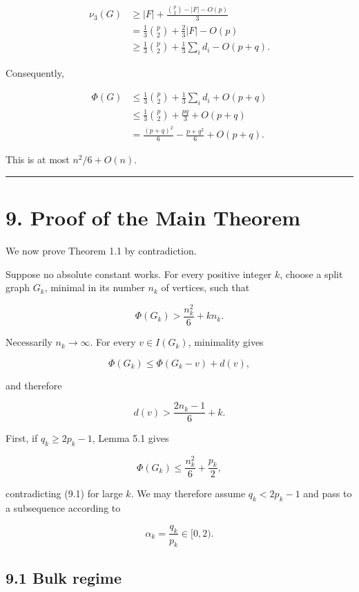 \documentclass[
  11pt,
]{article}
\begin{document}
\[
\begin{aligned}
\nu_3(G)
&\ge
|F|+\frac{\binom p2-|F|-O(p)}3\\
&=
\frac13\binom p2+\frac23|F|-O(p)\\
&\ge
\frac13\binom p2+\frac13\sum_i d_i-O(p+q).
\end{aligned}
\tag{8.10}
\]

Consequently,

\[
\begin{aligned}
\Phi(G)
&\le
\frac13\binom p2+\frac13\sum_i d_i+O(p+q)\\
&\le
\frac13\binom p2+\frac{pq}{3}+O(p+q)\\
&=
\frac{(p+q)^2}{6}-\frac{p+q^2}{6}+O(p+q).
\end{aligned}
\tag{8.11}
\]

This is at most \(n^2/6+O(n)\).

\begin{center}\rule{0.5\linewidth}{0.5pt}\end{center}

\section{9. Proof of the Main Theorem}\label{proof-of-the-main-theorem}

We now prove Theorem 1.1 by contradiction.

Suppose no absolute constant works. For every positive integer \(k\), choose a split graph \(G_k\), minimal in its number \(n_k\) of vertices, such that

\[
\Phi(G_k)
>
\frac{n_k^2}{6}+kn_k.
\tag{9.1}
\]

Necessarily \(n_k\to\infty\). For every \(v\in I(G_k)\), minimality gives

\[
\Phi(G_k)
\le
\Phi(G_k-v)+d(v),
\]

and therefore

\[
\boxed{
d(v)>
\frac{2n_k-1}{6}+k.
}
\tag{9.2}
\]

First, if \(q_k\ge2p_k-1\), Lemma 5.1 gives

\[
\Phi(G_k)
\le
\frac{n_k^2}{6}+\frac{p_k}{2},
\]

contradicting (9.1) for large \(k\). We may therefore assume \(q_k<2p_k-1\) and pass to a subsequence according to

\[
\alpha_k=\frac{q_k}{p_k}\in[0,2).
\]

\subsection{9.1 Bulk regime}\label{bulk-regime}
\end{document}
